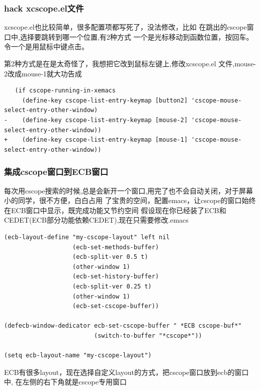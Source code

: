 \documentclass[adobefonts]{ctexart}
\begin{document}
\subsubsection{hack xcscope.el文件}
xcscope.el也比较简单，很多配置项都写死了，没法修改，比如
在跳出的cscope窗口中,选择要跳转到哪一个位置,有2种方式
一个是光标移动到函数位置，按回车。令一个是用鼠标中键点击。

第2种方式是在是太奇怪了，我想把它改到鼠标左键上,修改xcscope.el
文件,mouse-2改成mouse-1就大功告成
\begin{verbatim}
   (if cscope-running-in-xemacs
     (define-key cscope-list-entry-keymap [button2] 'cscope-mouse-select-entry-other-window)
-    (define-key cscope-list-entry-keymap [mouse-2] 'cscope-mouse-select-entry-other-window))
+    (define-key cscope-list-entry-keymap [mouse-1] 'cscope-mouse-select-entry-other-window))
\end{verbatim}

\subsubsection{集成cscope窗口到ECB窗口}
每次用cscope搜索的时候,总是会新开一个窗口,用完了也不会自动关闭，对于屏幕小的同学，很不方便，白白占用
了宝贵的空间，配置emacs，让cscope的窗口始终在ECB窗口中显示，既完成功能又节约空间
假设现在你已经装了ECB和CEDET(ECB部分功能依赖CEDET),现在只需要修改.emacs
\begin{verbatim}
(ecb-layout-define "my-cscope-layout" left nil
                   (ecb-set-methods-buffer)
                   (ecb-split-ver 0.5 t)
                   (other-window 1)
                   (ecb-set-history-buffer)
                   (ecb-split-ver 0.25 t)
                   (other-window 1)
                   (ecb-set-cscope-buffer))

(defecb-window-dedicator ecb-set-cscope-buffer " *ECB cscope-buf*"
                         (switch-to-buffer "*cscope*"))

(setq ecb-layout-name "my-cscope-layout")
\end{verbatim}
ECB有很多layout，现在选择自定义layout的方式，把cscope窗口放到ecb的窗口中,
在左侧的右下角就是cscope专用窗口
\end{document}
